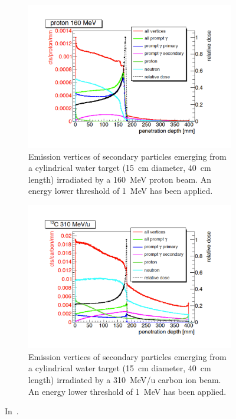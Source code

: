 \begin{figure}
\centering
\begin{subfigure}[t]{.49\textwidth}
\hspace{-1cm}\includegraphics[width=1.3\linewidth]{03_GraphicFiles/chapter2_GammaCameras/PG_secPartDistr_p.pdf}
\caption{Emission vertices of secondary particles emerging from a cylindrical water target (15~cm diameter, 40~cm length) irradiated by a 160~MeV proton beam. An energy lower threshold of 1~MeV has been applied.}
\label{chap2::fig::PGsecDistrp}
\end{subfigure}
\begin{subfigure}[t]{.49\textwidth}
\hspace{-1cm}\includegraphics[width=1.3\linewidth]{03_GraphicFiles/chapter2_GammaCameras/PG_secPartDistr_C.pdf}
\caption{Emission vertices of secondary particles emerging from a cylindrical water target (15~cm diameter, 40~cm length) irradiated by a 310~MeV/u carbon ion beam. An energy lower threshold of 1~MeV has been applied.}
\label{chap2::fig::PGsecDistrC}
\end{subfigure}
\caption{In~\cite{Krimmer2017}.}
\label{chap2::fig::PGsecDistr_gen}
\end{figure}

